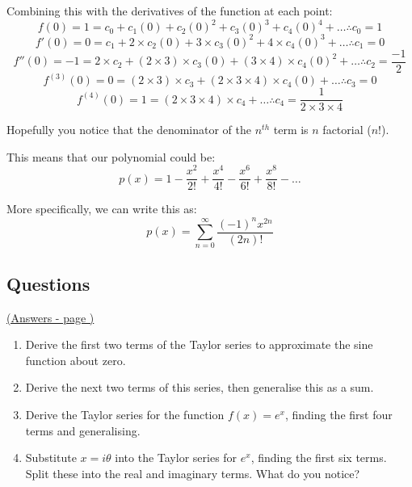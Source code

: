 \documentclass[../main.tex]{subfiles}
\begin{document}
Combining this with the derivatives of the function at each point:
\[f(0) = 1 = c_0 + c_1(0) + c_2(0)^2 + c_3(0)^3 + c_4(0)^4 + \dots \therefore c_0 = 1\]
\[f'(0) = 0 = c_1 + 2\times c_2(0) + 3\times c_3(0)^2 + 4\times c_4(0)^3 + \dots \therefore c_1 = 0\]
\[f''(0) = -1 = 2\times c_2 + (2\times 3)\times c_3(0) + (3\times 4)\times c_4(0)^2 + \dots \therefore c_2 = \frac{-1}{2}\]
\[f^{(3)}(0) = 0 = (2\times 3)\times c_3 + (2\times 3\times 4)\times c_4(0) + \dots \therefore c_3 = 0\]
\[f^{(4)}(0) = 1 = (2\times 3\times 4)\times c_4 + \dots \therefore c_4 = \frac{1}{2\times 3\times 4}\]

Hopefully you notice that the denominator of the $n^{th}$ term is $n$ factorial ($n!$).

This means that our polynomial could be:
\[p(x) = 1 - \frac{x^2}{2!} +\frac{x^4}{4!} - \frac{x^6}{6!} + \frac{x^8}{8!} - \dots\]

More specifically, we can write this as:
\[p(x) = \sum_{n=0}^{\infty} \frac{(-1)^{n}x^{2n}}{(2n)!}\]


\pagebreak
\hypertarget{taylorserieslink}{\subsection*{Questions}}
\hyperlink{taylorseriesanswers}{(Answers - page {\pageref*{Taylor series answers}})}

\label{taylor series}
\begin{enumerate}[itemsep=1cm]
    \item 
    Derive the first two terms of the Taylor series to approximate the sine function about zero.

    \item 
    Derive the next two terms of this series, then generalise this as a sum.

    \item
    Derive the Taylor series for the function $f(x)=e^x$, finding the first four terms and generalising.

    \item
    Substitute $x=i\theta$ into the Taylor series for $e^x$, finding the first six terms. Split these into the real and imaginary terms. What do you notice?

\end{enumerate}
\end{document}
